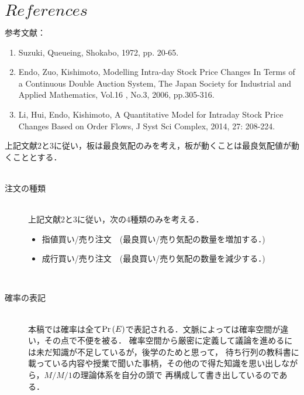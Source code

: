 \documentclass[a4j,papersize,disablejfam,slide,14pt]{jsarticle}
\def\prob#1{\mbox{${\rm Pr} \left( #1 \right)$}} %
\begin{document}
\section{$References$}
	参考文献：
    \begin{enumerate}
    	\item Suzuki, Queueing, Shokabo, 1972, pp. 20-65.
        \item Endo, Zuo, Kishimoto, 
        Modelling Intra-day Stock Price Changes In Terms of
        a Continuous Double Auction System, 
        The Japan Society for Industrial and Applied Mathematics, 
        Vol.16 , No.3, 2006, pp.305-316.
        \item Li, Hui, Endo, Kishimoto, A Quantitative Model for Intraday Stock Price
         Changes Based on Order Flows, 
         J Syst Sci Complex, 2014, 27: 208-224.
    \end{enumerate}
    上記文献$2$と$3$に従い，板は最良気配のみを考え，板が動くことは最良気配値が動くこととする．\\\\
    \begin{description}
    	\item[注文の種類]\mbox{}\\
     	上記文献$2$と$3$に従い，次の4種類のみを考える．
    	\begin{itemize}
    		\item 指値買い/売り注文　(最良買い/売り気配の数量を増加する．)
        	\item 成行買い/売り注文　(最良買い/売り気配の数量を減少する．)
    	\end{itemize}
        \mbox{}\\
        \item[確率の表記]\mbox{}\\
        	本稿では確率は全て$\prob{E}$で表記される．文脈によっては確率空間が違い，その点で不便を被る．
            確率空間から厳密に定義して議論を進めるには未だ知識が不足しているが，後学のためと思って，
            待ち行列の教科書に載っている内容や授業で聞いた事柄，その他ので得た知識を思い出しながら，$M/M/1$の理論体系を自分の頭で
            再構成して書き出しているのである．
     \end{description}
    
\newpage
\end{document}

